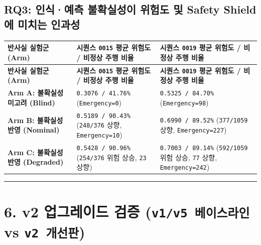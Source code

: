\documentclass[10.5pt,a4paper]{article}
\begin{document}
\subsection{RQ3: 인식·예측 불확실성이 위험도 및 Safety Shield에 미치는 인과성}

\begin{footnotesize}
\setlength{\tabcolsep}{4pt}
\setlength{\LTleft}{0pt}\setlength{\LTright}{0pt}
\begin{longtable}{>{\raggedright\arraybackslash}p{} >{\raggedright\arraybackslash}p{} >{\raggedright\arraybackslash}p{}}
\toprule
\textbf{반사실 실험군 (Arm)} & \textbf{시퀀스 \texttt{0015} 평균 위험도 / 비정상 주행 비율} & \textbf{시퀀스 \texttt{0019} 평균 위험도 / 비정상 주행 비율} \\
\midrule
\endfirsthead
\toprule
\textbf{반사실 실험군 (Arm)} & \textbf{시퀀스 \texttt{0015} 평균 위험도 / 비정상 주행 비율} & \textbf{시퀀스 \texttt{0019} 평균 위험도 / 비정상 주행 비율} \\
\midrule
\endhead
\bottomrule
\endfoot
\textbf{Arm A: 불확실성 미고려 (Blind)} & \texttt{0.\allowbreak{}3076 /\allowbreak{} 41.\allowbreak{}76\%} (\texttt{Emergency=0}) & \texttt{0.\allowbreak{}5325 /\allowbreak{} 84.\allowbreak{}70\%} (\texttt{Emergency=98}) \\
\textbf{Arm B: 불확실성 반영 (Nominal)} & \texttt{0.\allowbreak{}5189 /\allowbreak{} 90.\allowbreak{}43\%} (\texttt{248/\allowbreak{}376} 상향, \texttt{Emergency=10}) & \texttt{0.\allowbreak{}6990 /\allowbreak{} 89.\allowbreak{}52\%} (\texttt{377/\allowbreak{}1059} 상향, \texttt{Emergency=227}) \\
\textbf{Arm C: 불확실성 반영 (Degraded)} & \texttt{0.\allowbreak{}5428 /\allowbreak{} 90.\allowbreak{}96\%} (\texttt{254/\allowbreak{}376} 위험 상승, \texttt{23} 상향) & \texttt{0.\allowbreak{}7003 /\allowbreak{} 89.\allowbreak{}14\%} (\texttt{592/\allowbreak{}1059} 위험 상승, \texttt{77} 상향, \texttt{Emergency=242}) \\
\end{longtable}
\end{footnotesize}


\par\noindent\rule{\textwidth}{0.4pt}\par\medskip

\section{6. v2 업그레이드 검증 (\texttt{v1/\allowbreak{}v5 베이스라인} vs \texttt{v2 개선판})}
\end{document}
